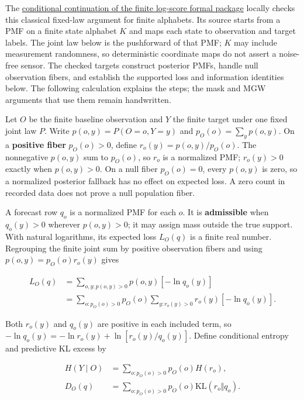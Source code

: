 \documentclass[11pt,a4paper]{article}
\begin{document}
The \href{https://github.com/sepahead/pid-rs/blob/main/audit/formal/lean-finite-logscore/PUBLICATION.md}{conditional continuation of the finite log-score formal package} locally checks this classical fixed-law argument for finite alphabets. Its source starts from a PMF on a finite state alphabet \(K\) and maps each state to observation and target labels. The joint law below is the pushforward of that PMF; \(K\) may include measurement randomness, so deterministic coordinate maps do not assert a noise-free sensor. The checked targets construct posterior PMFs, handle null observation fibers, and establish the supported loss and information identities below. The following calculation explains the steps; the mask and MGW arguments that use them remain handwritten.

Let \(O\) be the finite baseline observation and \(Y\) the finite target under one fixed joint law \(P\). Write \(p(o,y)=P(O=o,Y=y)\) and \(p_O(o)=\sum_y p(o,y)\). On a \textbf{positive fiber} \(p_O(o)>0\), define \(r_o(y)=p(o,y)/p_O(o)\). The nonnegative \(p(o,y)\) sum to \(p_O(o)\), so \(r_o\) is a normalized PMF; \(r_o(y)>0\) exactly when \(p(o,y)>0\). On a null fiber \(p_O(o)=0\), every \(p(o,y)\) is zero, so a normalized posterior fallback has no effect on expected loss. A zero count in recorded data does not prove a null population fiber.

A forecast row \(q_o\) is a normalized PMF for each \(o\). It is \textbf{admissible} when \(q_o(y)>0\) wherever \(p(o,y)>0\); it may assign mass outside the true support. With natural logarithms, its expected loss \(L_O(q)\) is a finite real number. Regrouping the finite joint sum by positive observation fibers and using \(p(o,y)=p_O(o)r_o(y)\) gives

\[
\begin{aligned}
L_O(q)
&=\sum_{o,y:p(o,y)>0}p(o,y)[-\ln q_o(y)]\\
&=\sum_{o:p_O(o)>0}p_O(o)
  \sum_{y:r_o(y)>0}r_o(y)[-\ln q_o(y)].
\end{aligned}
\]

Both \(r_o(y)\) and \(q_o(y)\) are positive in each included term, so \(-\ln q_o(y)=-\ln r_o(y)+\ln[r_o(y)/q_o(y)]\). Define conditional entropy and predictive KL excess by

\[
\begin{aligned}
H(Y\mid O)&=\sum_{o:p_O(o)>0}p_O(o)H(r_o),\\
D_O(q)&=\sum_{o:p_O(o)>0}p_O(o)
\mathrm{KL}(r_o\Vert q_o).
\end{aligned}
\]
\end{document}
